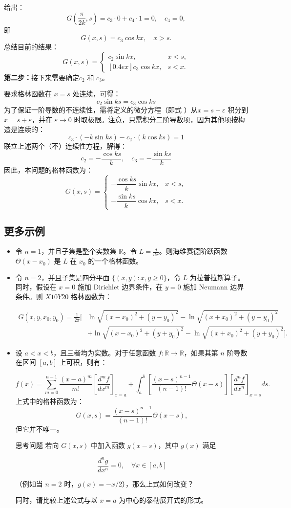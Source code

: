 给出：
$$
G\left(\frac{\pi}{2k},s\right) = c_3 \cdot 0 + c_4 \cdot 1 = 0,
\quad c_4 = 0,~
$$
即
$$
G(x,s) = c_3 \cos kx, \quad x > s.~
$$
总结目前的结果：
$$
G(x,s) = 
\begin{cases}
c_2 \sin kx, & x < s, \\
[0.4ex]
c_3 \cos kx, & s < x.
\end{cases}~
$$
\textbf{第二步：}接下来需要确定$c_{2}$ 和 $c_{3}$。

要求格林函数在 $x = s$ 处连续，可得：
$$
c_{2} \sin ks = c_{3} \cos ks~
$$
为了保证一阶导数的不连续性，需将定义的微分方程（即式 \*）从$x = s - \varepsilon$ 积分到 $x = s + \varepsilon$，并在 $\varepsilon \to 0$ 时取极限。注意，只需积分二阶导数项，因为其他项按构造是连续的：
$$
c_{3} \cdot (-k \sin ks) - c_{2} \cdot (k \cos ks) = 1~
$$
联立上述两个（不）连续性方程，解得：
$$
c_{2} = -\frac{\cos ks}{k}, 
\quad 
c_{3} = -\frac{\sin ks}{k}~
$$
因此，本问题的格林函数为：
$$
G(x,s) = 
\begin{cases}
-\dfrac{\cos ks}{k} \sin kx, & x < s, \\
-\dfrac{\sin ks}{k} \cos kx, & s < x.
\end{cases}~
$$
\subsection{更多示例}
\begin{itemize}
\item 令 $n = 1$，并且子集是整个实数集 $\mathbb{R}$。令 $L = \frac{d}{dx}$。则海维赛德阶跃函数 $\Theta(x - x_{0})$ 是 $L$ 在 $x_{0}$ 的一个格林函数。

\item 令 $n = 2$，并且子集是四分平面 $\{(x, y) : x, y \geq 0\}$，令 $L$ 为拉普拉斯算子。同时，假设在 $x = 0$ 施加 Dirichlet 边界条件，在 $y = 0$ 施加 Neumann 边界条件。则 $X10Y20$ 格林函数为：

$$
\begin{aligned}
G(x,y,x_{0},y_{0}) = \frac{1}{2\pi} \Big[
&\ln \sqrt{(x-x_{0})^{2} + (y-y_{0})^{2}}
- \ln \sqrt{(x+x_{0})^{2} + (y-y_{0})^{2}} \\
&+ \ln \sqrt{(x-x_{0})^{2} + (y+y_{0})^{2}}
- \ln \sqrt{(x+x_{0})^{2} + (y+y_{0})^{2}}
\Big].
\end{aligned}
$$
\item 设 $a < x < b$，且三者均为实数。对于任意函数
   $f: \mathbb{R} \to \mathbb{R}$，如果其第 $n$ 阶导数在区间 $[a,b]$ 上可积，则有：

$$
f(x) = \sum_{m=0}^{n-1} \frac{(x-a)^{m}}{m!}
\left[ \frac{d^{m} f}{dx^{m}} \right]_{x=a}
+ \int_{a}^{b}
\left[
\frac{(x-s)^{n-1}}{(n-1)!} \Theta(x-s)
\right]
\left[ \frac{d^{n} f}{dx^{n}} \right]_{x=s} ds.~
$$
上式中的格林函数为：
$$
G(x,s) = \frac{(x-s)^{n-1}}{(n-1)!} \Theta(x-s),~
$$
但它并不唯一。

思考问题
若向 $G(x,s)$ 中加入函数 $g(x-s)$，其中
$g(x)$ 满足

$$
\frac{d^{n} g}{dx^{n}} = 0,
\quad \forall x \in [a,b]~
$$

（例如当 $n=2$ 时，$g(x) = -x/2$），那么上式如何改变？

同时，请比较上述公式与以 $x = a$ 为中心的泰勒展开式的形式。

\end{itemize}